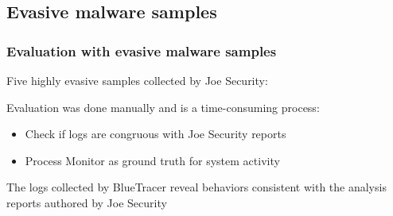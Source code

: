 \documentclass[compress]{beamer}
\begin{document}
\subsection{Evasive malware samples}
\begin{frame}
    \frametitle{Evaluation with evasive malware samples}
    
	Five highly evasive samples collected by Joe Security:    
    
    \begin{table}[h]
\vspace*{-0.1cm}
\begin{center}
\end{center}
\end{table}
\vspace{-0.1cm}
Evaluation was done manually and is a time-consuming process:
\begin{itemize}
\item Check if logs are congruous with Joe Security reports
\item Process Monitor as ground truth for system activity
\end{itemize}
\medskip
\begin{beamerboxesrounded}[shadow=true]{}
The
logs collected by BlueTracer reveal behaviors consistent with the analysis reports
authored by Joe Security
\end{beamerboxesrounded}	

\end{frame}
\end{document}

